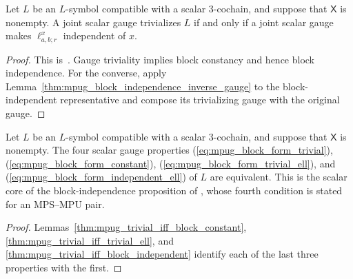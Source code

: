 \begin{lemma}
    \label{thm:mpug_trivial_iff_block_independent}
    \leanok
    Let $L$ be an $L$-symbol compatible with a scalar $3$-cochain,
    and suppose that $\mathsf X$ is nonempty. A joint scalar gauge trivializes
    $L$ if and only if a joint scalar gauge makes $\ell^x_{a,b;r}$ independent
    of $x$.
\end{lemma}

\begin{proof}\leanok
    This is~\cite[``Scalar gauge triviality and block
        independence'']{QICLean2026Blueprint}.
    Gauge triviality implies block constancy and hence block independence.
    For the converse, apply
    Lemma~\ref{thm:mpug_block_independence_inverse_gauge} to the
    block-independent representative and compose its trivializing gauge with
    the original gauge.
\end{proof}

\begin{lemma}
    \label{thm:mpug_block_independence_four_forms}
    \leanok
    Let $L$ be an $L$-symbol compatible with a scalar $3$-cochain,
    and suppose that $\mathsf X$ is nonempty. The four scalar gauge
    properties (\ref{eq:mpug_block_form_trivial}),
    (\ref{eq:mpug_block_form_constant}),
    (\ref{eq:mpug_block_form_trivial_ell}), and
    (\ref{eq:mpug_block_form_independent_ell}) of $L$ are equivalent. This is
    the scalar core of the block-independence proposition of
    \cite{FrancoRubio2025MPUGauging}, whose fourth condition is stated for an
    MPS--MPU pair.
\end{lemma}

\begin{proof}\leanok
    Lemmas~\ref{thm:mpug_trivial_iff_block_constant},
    \ref{thm:mpug_trivial_iff_trivial_ell}, and
    \ref{thm:mpug_trivial_iff_block_independent} identify each of the last
    three properties with the first.
\end{proof}

